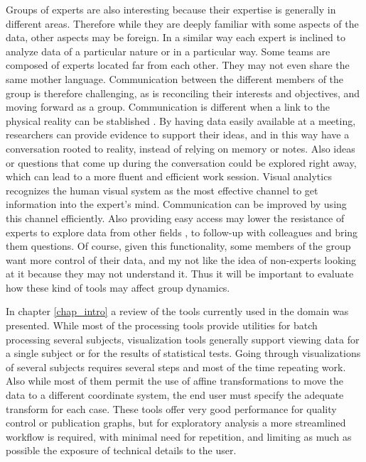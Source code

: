 


Groups of experts are also interesting because their expertise is generally in different areas. Therefore while they are deeply familiar with some aspects of the data, other aspects may be foreign. In a similar way each expert is inclined to analyze data of a particular nature or in a particular way. Some teams are composed of experts located far from each other. They may not even share the same mother language. Communication between the different members of the group is therefore challenging, as is reconciling their interests and objectives, and moving forward as a group. Communication is different when a link to the physical reality can be stablished \autocite{rojas_arredondo_dinamica_2010}. By having data easily available at a meeting, researchers can provide evidence to support their ideas, and in this way have a conversation rooted to reality, instead of relying on memory or notes. Also ideas or questions that come up during the conversation could be explored right away, which can lead to a more fluent and efficient work session. Visual analytics recognizes the human visual system as the most effective channel to get information into the expert's mind. Communication can be improved by using this channel efficiently. Also providing easy access may lower the resistance of experts to explore data from other fields , to follow-up with colleagues and bring them questions. Of course, given this functionality, some members of the group want more control of their data, and my not like the idea of non-experts looking at it because they may not understand it. Thus it will be important to evaluate how these kind of tools may affect group dynamics.


\bigskip

In chapter \ref{chap_intro} a review of the tools currently used in the domain was presented. While most of the processing tools provide utilities for batch processing several subjects, visualization tools generally support viewing data for a single subject or for the results of statistical tests. Going through visualizations of several subjects requires several steps and most of the time repeating work. Also while most of them permit the use of affine transformations to move the data to a different coordinate system, the end user must specify the adequate transform for each case. These tools offer very good performance for quality control or publication graphs, but for exploratory analysis a more streamlined workflow is required, with minimal need for repetition, and limiting as much as possible the exposure of technical details to the user. 

